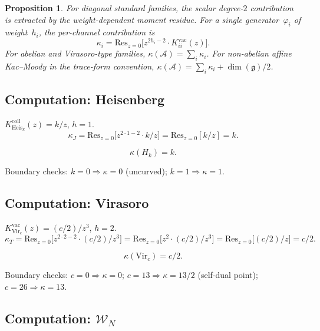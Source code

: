 \documentclass[11pt,reqno]{amsart}
\newtheorem{proposition}[theorem]{Proposition}
\theoremstyle{definition}
\theoremstyle{remark}
\newcommand{\cA}{\mathcal{A}}
\newcommand{\cW}{\mathcal{W}}
\newcommand{\fg}{\mathfrak{g}}
\newcommand{\Res}{\mathrm{Res}}
\newcommand{\Vir}{\mathrm{Vir}}
\newcommand{\Heis}{\mathrm{Heis}}
\numberwithin{equation}{section}
\begin{document}
\begin{proposition}\label{prop:kappa-formula}
For diagonal standard families, the scalar degree-$2$ contribution is
extracted by the weight-dependent moment residue. For a single
generator~$\varphi_i$ of weight~$h_i$, the per-channel contribution is
\begin{equation}\label{eq:kappa-per-channel}
\kappa_i = \Res_{z=0}\bigl[z^{2h_i - 2}\cdot
 K_{ii}^{\mathrm{vac}}(z)\bigr].
\end{equation}
For abelian and Virasoro-type families,
$\kappa(\cA)=\sum_i\kappa_i$. For non-abelian affine
Kac--Moody in the trace-form convention,
$\kappa(\cA)=\sum_i\kappa_i+\dim(\fg)/2$.
\end{proposition}

\subsection{Computation: Heisenberg}\label{subsec:av-heis}

$K_{\Heis_k}^{\mathrm{coll}}(z)=k/z$, $h=1$.
\[
\kappa_J = \Res_{z=0}\bigl[z^{2\cdot 1 - 2}\cdot k/z\bigr]
= \Res_{z=0}[k/z] = k.
\]

\begin{equation}\label{eq:kappa-heis}
\boxed{\;\kappa(H_k) = k.\;}
\end{equation}

Boundary checks: $k = 0 \Rightarrow \kappa = 0$ (uncurved);
$k = 1 \Rightarrow \kappa = 1$.

\subsection{Computation: Virasoro}\label{subsec:av-vir}

$K_{\Vir_c}^{\mathrm{vac}}(z)=(c/2)/z^3$, $h=2$.
\[
\kappa_T = \Res_{z=0}\bigl[z^{2\cdot 2 - 2}\cdot
 (c/2)/z^3\bigr]
= \Res_{z=0}\bigl[z^2\cdot(c/2)/z^3\bigr]
= \Res_{z=0}\bigl[(c/2)/z\bigr] = c/2.
\]

\begin{equation}\label{eq:kappa-vir}
\boxed{\;\kappa(\Vir_c) = c/2.\;}
\end{equation}

Boundary checks: $c = 0 \Rightarrow \kappa = 0$;
$c = 13 \Rightarrow \kappa = 13/2$ (self-dual point);
$c = 26 \Rightarrow \kappa = 13$.

\subsection{Computation: $\cW_N$}\label{subsec:av-wn}
\end{document}
